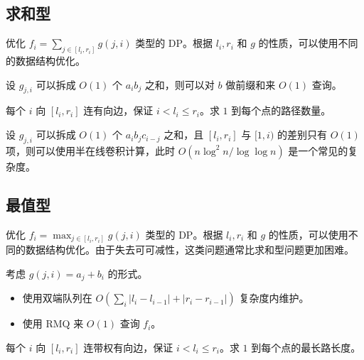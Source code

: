 \subsection{求和型}

优化 $f_i = \sum_{j\in [l_i,r_i]} g(j,i)$ 类型的 DP。根据 $l_i,r_i$ 和 $g$ 的性质，可以使用不同的数据结构优化。

\begin{example}
    设 $g_{j,i}$ 可以拆成 $O(1)$ 个 $a_ib_j$ 之和，则可以对 $b$ 做前缀和来 $O(1)$ 查询。
\end{example}

\begin{exercise}
    每个 $i$ 向 $[l_i,r_i]$ 连有向边，保证 $i<l_i\le r_i$。求 $1$ 到每个点的路径数量。
\end{exercise}

\begin{example}
    设 $g_{j,i}$ 可以拆成 $O(1)$ 个 $a_ib_jc_{i-j}$ 之和，且 $[l_i,r_i]$ 与 $[1,i)$ 的差别只有 $O(1)$ 项，则可以使用半在线卷积计算，此时 $O(n\log^2 n/\log\log n)$ 是一个常见的复杂度。
\end{example}



\subsection{最值型}

优化 $f_i = \max_{j\in [l_i,r_i]} g(j,i)$ 类型的 DP。根据 $l_i,r_i$ 和 $g$ 的性质，可以使用不同的数据结构优化。由于失去可可减性，这类问题通常比求和型问题更加困难。

\begin{exercise}
    考虑 $g(j,i)=a_j+b_i$ 的形式。
    \begin{itemize}
        \item 使用双端队列在 $O\left(\sum_i |l_i-l_{i-1}|+|r_i-r_{i-1}|\right)$ 复杂度内维护。
        \item 使用 RMQ 来 $O(1)$ 查询 $f_i$。
    \end{itemize}
\end{exercise}

\begin{example}
\end{example}

\begin{exercise}
    每个 $i$ 向 $[l_i,r_i]$ 连带权有向边，保证 $i<l_i\le r_i$。求 $1$ 到每个点的最长路长度。
\end{exercise}

